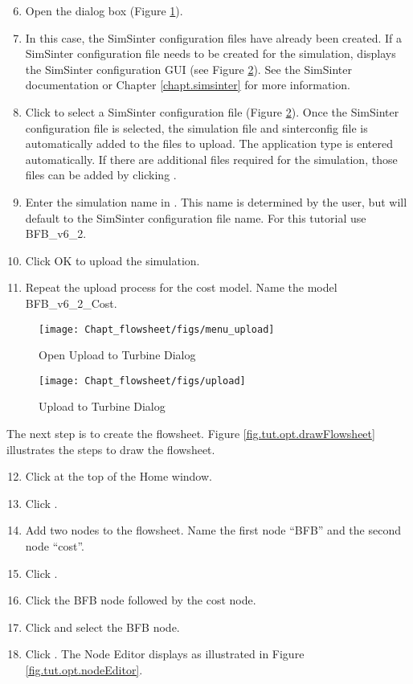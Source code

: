 \begin{enumerate}
	\setcounter{enumi}{5}
	\item Open the  dialog box (Figure \ref{fig.tut.opt.menu.upload}).
	\item In this case, the SimSinter configuration files have already been created. If a SimSinter configuration file needs to be created for the simulation,  displays the SimSinter configuration GUI (see Figure \ref{fig.tut.opt.upload}). See the SimSinter documentation or Chapter \ref{chapt.simsinter} for more information.
	\item Click  to select a SimSinter configuration file (Figure \ref{fig.tut.opt.upload}). Once the SimSinter configuration file is selected, the simulation file and sinterconfig file is automatically added to the files to upload. The application type is entered automatically. If there are additional files required for the simulation, those files can be added by clicking .
	\item Enter the simulation name in .  This name is determined by the user, but will default to the SimSinter configuration file name. For this tutorial use BFB\_v6\_2.
	\item Click OK to upload the simulation.
	\item Repeat the upload process for the cost model.  Name the model \\ BFB\_v6\_2\_Cost.
\end{enumerate}
\begin{figure}[H]
	\begin{center}
		\texttt{[image: Chapt\_flowsheet/figs/menu\_upload]}
		\caption{Open Upload to Turbine Dialog}
		\label{fig.tut.opt.menu.upload}
	\end{center}
\end{figure}
\begin{figure}[H]
	\begin{center}
		\texttt{[image: Chapt\_flowsheet/figs/upload]}
		\caption{Upload to Turbine Dialog}
		\label{fig.tut.opt.upload}
	\end{center}
\end{figure}
The next step is to create the flowsheet.  Figure \ref{fig.tut.opt.drawFlowsheet} illustrates the steps to draw the flowsheet.
\begin{enumerate}
	\setcounter{enumi}{11}
	\item Click  at the top of the Home window.
	\item Click .
	\item Add two nodes to the flowsheet. Name the first node ``BFB'' and the second node ``cost''.
	\item Click .
	\item Click the BFB node followed by the cost node.
	\item Click  and select the BFB node.
	\item Click .  The Node Editor displays as illustrated in Figure \ref{fig.tut.opt.nodeEditor}.
\end{enumerate}
